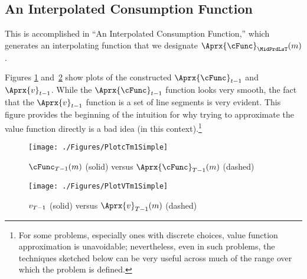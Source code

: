 \documentclass[SolvingMicroDSOPs]{subfiles}
\begin{document}


\hypertarget{an-interpolated-consumption-function}{}
\subsection{An Interpolated Consumption Function} \label{subsec:LinInterp}


This is accomplished in ``An Interpolated Consumption Function,'' which generates an interpolating function that we designate $\Aprx{\cFunc}_{\MidPrdLsT}(\mNrm)$. %


Figures \ref{fig:PlotcTm1Simple} and~\ref{fig:PlotVTm1Simple} show
plots of the constructed $\Aprx{\cFunc}_{\prdT-1}$ and $\Aprx{\vFunc}_{\prdT-1}$. While the $\Aprx{\cFunc}_{\prdT-1}$ function looks very smooth, the fact that the $\Aprx{\vFunc}_{\prdT-1}$ function is a set of line segments is very evident.  This figure provides the beginning of the intuition for why trying to approximate the value function directly is a bad idea (in this context).\footnote{For some problems, especially ones with discrete choices, value function approximation is unavoidable; nevertheless, even in such problems, the techniques sketched below can be very useful across much of the range over which the problem is defined.}

\hypertarget{PlotcTm1Simple}{}
\begin{figure}
  \centerline{\texttt{[image: ./Figures/PlotcTm1Simple]}}
  \caption{$\cFunc_{\trmT-1}(\mNrm)$ (solid) versus $\Aprx{\cFunc}_{\trmT-1}(\mNrm)$ (dashed)}
  \label{fig:PlotcTm1Simple}
\end{figure}

\hypertarget{PlotvTm1Simple}{}
\begin{figure}
  \centerline{\texttt{[image: ./Figures/PlotVTm1Simple]}}
  \caption{$v_{T-1}$ (solid) versus $\Aprx{\vFunc}_{\trmT-1}(\mNrm)$ (dashed)}
  \label{fig:PlotVTm1Simple}
\end{figure}
\end{document}
